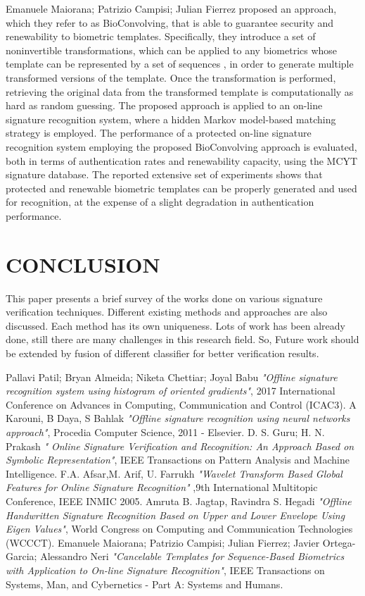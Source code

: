 \documentclass[]{article}
\begin{document}
	
	Emanuele Maiorana; Patrizio Campisi; Julian Fierrez \cite{bib6} proposed an approach, which they refer to as BioConvolving, that is able to guarantee 
	security and renewability to biometric templates. Specifically, they introduce a set of noninvertible 
	transformations, which can be applied to any biometrics whose template can be represented by a set of sequences
	, in order to generate multiple transformed versions of the template. Once the transformation is performed,
	retrieving the original data from the transformed template is computationally as hard as random guessing.
	The proposed approach is applied to an on-line signature recognition system, where a hidden Markov model-based 
	matching strategy is employed. The performance of a protected on-line signature recognition system employing 
	the proposed BioConvolving approach is evaluated, both in terms of authentication rates and renewability 
	capacity, using the MCYT signature database. The reported extensive set of experiments shows that protected and
	renewable biometric templates can be properly generated and used for recognition, at the expense of a slight 
	degradation in authentication performance.
	\section{CONCLUSION}
	This paper presents a brief survey of the  works done on various signature verification techniques. Different	existing methods and approaches are also discussed. Each method has its own uniqueness. Lots of work	has been already done, still there are many challenges in this research field. So, Future work should be extended by	fusion of different classifier for better verification results.
	\begin{thebibliography}{99}
	Pallavi Patil; Bryan Almeida; Niketa Chettiar; Joyal Babu \textit{"Offline signature recognition system using histogram of oriented gradients"}, 2017 International Conference on Advances in Computing, Communication and Control (ICAC3).
	A Karouni, B Daya, S Bahlak \textit{"Offline signature recognition using neural networks approach"}, Procedia Computer Science, 2011 - Elsevier.
	D. S. Guru; H. N. Prakash \textit{"	Online Signature Verification and Recognition: An Approach Based on Symbolic Representation"}, IEEE Transactions on Pattern Analysis and Machine Intelligence.
	F.A. Afsar,M. Arif, U. Farrukh \textit{"Wavelet Transform Based Global Features for Online Signature Recognition"}	,9th International Multitopic Conference, IEEE INMIC 2005.
	Amruta B. Jagtap, Ravindra S. Hegadi \textit{"Offline Handwritten Signature Recognition Based on Upper and Lower Envelope Using Eigen Values"}, World Congress on Computing and Communication Technologies (WCCCT).
	Emanuele Maiorana; Patrizio Campisi; Julian Fierrez; Javier Ortega-Garcia; Alessandro Neri \textit{"Cancelable Templates for Sequence-Based Biometrics with Application to On-line Signature Recognition"}, IEEE Transactions on Systems, Man, and Cybernetics - Part A: Systems and Humans.
\end{thebibliography}	
\end{document}
